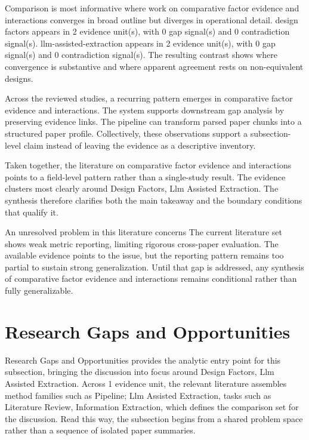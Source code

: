 \documentclass{article}
\begin{document}
Comparison is most informative where work on comparative factor evidence and interactions converges in broad outline but diverges in operational detail. design factors appears in 2 evidence unit(s), with 0 gap signal(s) and 0 contradiction signal(s). llm-assisted-extraction appears in 2 evidence unit(s), with 0 gap signal(s) and 0 contradiction signal(s). The resulting contrast shows where convergence is substantive and where apparent agreement rests on non-equivalent designs. \cite{01_2001_hamed_safety_science}

Across the reviewed studies, a recurring pattern emerges in comparative factor evidence and interactions. The system supports downstream gap analysis by preserving evidence links. The pipeline can transform parsed paper chunks into a structured paper profile. Collectively, these observations support a subsection-level claim instead of leaving the evidence as a descriptive inventory. \cite{01_2001_hamed_safety_science}

Taken together, the literature on comparative factor evidence and interactions points to a field-level pattern rather than a single-study result. The evidence clusters most clearly around Design Factors, Llm Assisted Extraction. The synthesis therefore clarifies both the main takeaway and the boundary conditions that qualify it. \cite{01_2001_hamed_safety_science}

An unresolved problem in this literature concerns The current literature set shows weak metric reporting, limiting rigorous cross-paper evaluation. The available evidence points to the issue, but the reporting pattern remains too partial to sustain strong generalization. Until that gap is addressed, any synthesis of comparative factor evidence and interactions remains conditional rather than fully generalizable. \cite{01_2001_hamed_safety_science}

\section{Research Gaps and Opportunities}
Research Gaps and Opportunities provides the analytic entry point for this subsection, bringing the discussion into focus around Design Factors, Llm Assisted Extraction. Across 1 evidence unit, the relevant literature assembles method families such as Pipeline; Llm Assisted Extraction, tasks such as Literature Review, Information Extraction, which defines the comparison set for the discussion. Read this way, the subsection begins from a shared problem space rather than a sequence of isolated paper summaries. \cite{01_2001_hamed_safety_science}
\end{document}
